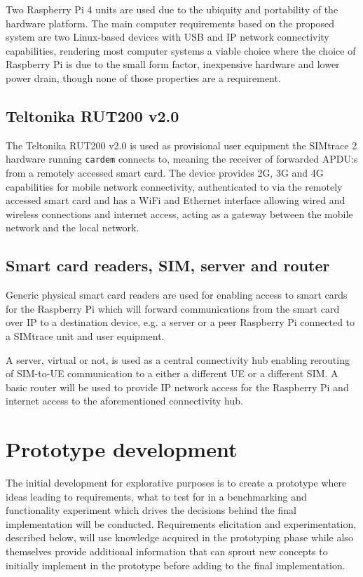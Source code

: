 Two Raspberry Pi 4 units are used due to the ubiquity and
portability of the hardware platform. The main computer
requirements based on the proposed system are two Linux-based
devices with USB and IP network connectivity capabilities,
rendering most computer systems a viable choice where the choice
of Raspberry Pi is due to the small form factor, inexpensive
hardware and lower power drain, though none of those properties
are a requirement.

\subsection{Teltonika RUT200 v2.0}

The Teltonika RUT200 v2.0 is used as provisional user equipment
the SIMtrace 2 hardware running \verb|cardem| connects to, meaning
the receiver of forwarded APDU:s from a remotely accessed smart
card. The device provides 2G, 3G and 4G capabilities for mobile
network connectivity, authenticated to via the remotely accessed
smart card and has a WiFi and Ethernet interface allowing wired
and wireless connections and internet access, acting as a gateway
between the mobile network and the local network.

\subsection{Smart card readers, SIM, server and router}

Generic physical smart card readers are used for enabling access to
smart cards for the Raspberry Pi which will forward communications
from the smart card over IP to a destination device, e.g. a server
or a peer Raspberry Pi connected to a SIMtrace unit and user
equipment.

A server, virtual or not, is used as a central connectivity hub
enabling rerouting of SIM-to-UE communication to a either a
different UE or a different SIM. A basic router will be used to
provide IP network access for the Raspberry Pi and internet access
to the aforementioned connectivity hub.

\section{Prototype development}
\label{sec:prototype-development}

The initial development for explorative purposes is to create a
prototype \cite[62]{sommerville-software-engineering} \cite[56]{thomas-hunt-pragmatic-programmer} where ideas leading to
requirements, what to test for in a benchmarking and functionality
experiment which drives the decisions behind the final
implementation will be conducted. Requirements elicitation and
experimentation, described below, will use knowledge acquired in
the prototyping phase while also themselves provide additional
information that can sprout new concepts to initially implement in
the prototype before adding to the final implementation.

